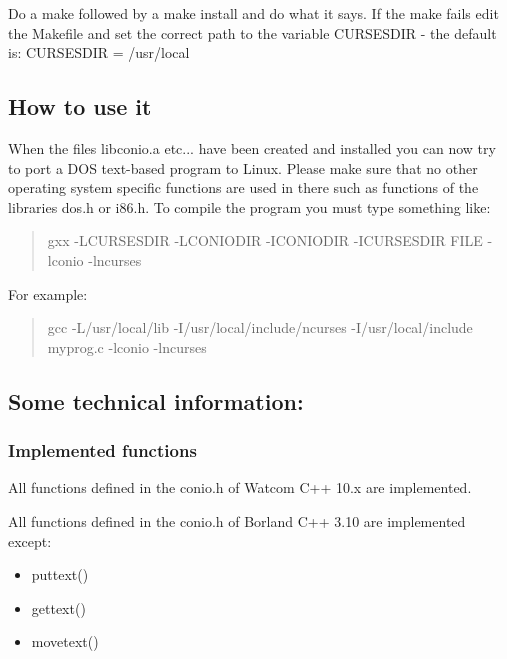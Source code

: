\documentclass[10pt,a4paper,oneside,onecolumn]{article}
\begin{document}
Do a \lyxquote{}make\lyxquote{} followed by a \lyxquote{}make install\lyxquote{}
and do what it says. If the \lyxquote{}make\lyxquote{} fails edit
the Makefile and set the correct path to the variable CURSESDIR -
the default is: CURSESDIR = /usr/local


\subsection{How to use it}

When the files libconio.a etc... have been created and installed you
can now try to port a DOS text-based program to Linux. Please make
sure that no other operating system specific functions are used in
there such as functions of the libraries \lyxquote{}dos.h\lyxquote{}
or \lyxquote{}i86.h\lyxquote{}. To compile the program you must
type something like:

\begin{quote}

gxx -LCURSESDIR -LCONIODIR -ICONIODIR -ICURSESDIR FILE -lconio -lncurses


\end{quote}

For example:

\begin{quote}

gcc -L/usr/local/lib -I/usr/local/include/ncurses -I/usr/local/include
myprog.c -lconio -lncurses

\end{quote}


\subsection{Some technical information:}


\subsubsection{Implemented functions}

All functions defined in the conio.h of Watcom C++ 10.x are implemented.

All functions defined in the conio.h of Borland C++ 3.10 are implemented
except:

\begin{itemize}

\item puttext() 

\item gettext() 

\item movetext()

\end{itemize}
\end{document}
